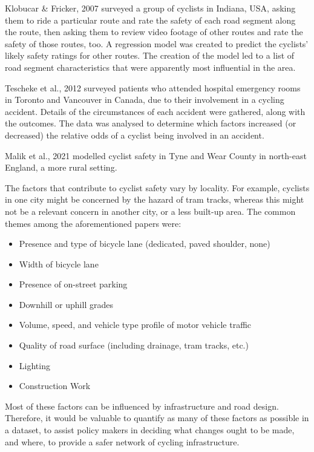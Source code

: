 \documentclass[11pt,twoside]{report}
\begin{document}
Klobucar \& Fricker, 2007 \cite{BIKESAFETY} surveyed a group of cyclists in Indiana, USA, asking them to ride a particular route and rate the safety of each road segment along the route, then asking them to review video footage of other routes and rate the safety of those routes, too.  A regression model was created to predict the cyclists' likely safety ratings for other routes.  The creation of the model led to a list of road segment characteristics that were apparently most influential in the area.

Tescheke et al., 2012 \cite{Teschke2012} surveyed patients who attended hospital emergency rooms in Toronto and Vancouver in Canada, due to their involvement in a cycling accident.  Details of the circumstances of each accident were gathered, along with the outcomes.  The data was analysed to determine which factors increased (or decreased) the relative odds of a cyclist being involved in an accident.

Malik et al., 2021 \cite{Malik2021} modelled cyclist safety in Tyne and Wear County in north-east England, a more rural setting.

The factors that contribute to cyclist safety vary by locality.  For example, cyclists in one city might be concerned by the hazard of tram tracks, whereas this might not be a relevant concern in another city, or a less built-up area.  The common themes among the aforementioned papers were:
\begin{itemize}
\item{Presence and type of bicycle lane (dedicated, paved shoulder, none)}
\item{Width of bicycle lane}
\item{Presence of on-street parking}
\item{Downhill or uphill grades}
\item{Volume, speed, and vehicle type profile of motor vehicle traffic}
\item{Quality of road surface (including drainage, tram tracks, etc.)}
\item{Lighting}
\item{Construction Work}
\end{itemize}
Most of these factors can be influenced by infrastructure and road design.  Therefore, it would be valuable to quantify as many of these factors as possible in a dataset, to assist policy makers in deciding what changes ought to be made, and where, to provide a safer network of cycling infrastructure.

\end{document}
